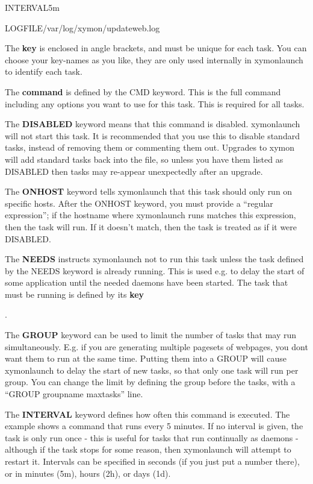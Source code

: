 INTERVAL5m  
 
LOGFILE/var/log/xymon/updateweb.log 


  The \textbf{key} is enclosed in angle brackets, and must be unique
  for each task. You can choose your key-names as you like, they are
  only used internally in xymonlaunch to identify each task. 



  The \textbf{command}
 is defined by the CMD keyword. This is the full command including any
 options you want to use for this task. This is required for all
 tasks. 



  The \textbf{DISABLED}
 keyword means that this command is disabled. xymonlaunch will not
 start this task. It is recommended that you use this to disable
 standard tasks, instead of removing them or commenting them
 out. Upgrades to xymon will add standard tasks back into the file,
 so unless you have them listed as DISABLED then tasks may re-appear
 unexpectedly after an upgrade. 



  The \textbf{ONHOST}
 keyword tells xymonlaunch that this task should only run on specific
 hosts. After the ONHOST keyword, you must provide a ``regular
 expression''; if the hostname where xymonlaunch runs matches this
 expression, then the task will run. If it doesn't match, then the
 task is treated as if it were DISABLED. 



  The \textbf{NEEDS}
 instructs xymonlaunch not to run this task unless the task defined
 by the NEEDS keyword is already running. This is used e.g. to delay
 the start of some application until the needed daemons have been
 started. The task that must be running is defined by its \textbf{key}

. 


  The \textbf{GROUP}
 keyword can be used to limit the number of tasks that may run
 simultaneously. E.g. if you are generating multiple pagesets of
 webpages, you dont want them to run at the same time. Putting them
 into a GROUP will cause xymonlaunch to delay the start of new tasks,
 so that only one task will run per group. You can change the limit by
 defining the group before the tasks, with a ``GROUP groupname
 maxtasks'' line. 



  The \textbf{INTERVAL}
 keyword defines how often this command is executed. The example shows
 a command that runs every 5 minutes. If no interval is given, the
 task is only run once - this is useful for tasks that run continually
 as daemons - although if the task stops for some reason, then
 xymonlaunch will attempt to restart it. Intervals can be specified
 in seconds (if you just put a number there), or in minutes (5m),
 hours (2h), or days (1d). 



